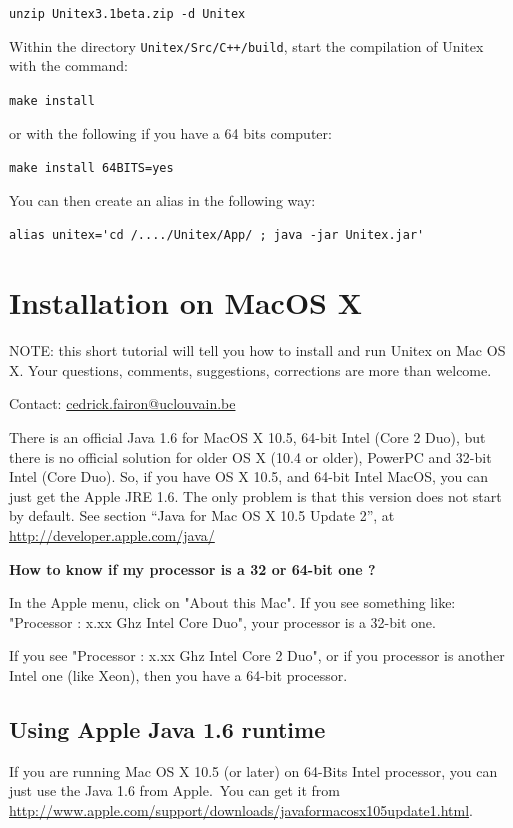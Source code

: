 \bigskip \noindent \verb$unzip Unitex3.1beta.zip -d Unitex$

\bigskip
\noindent Within the directory \verb|Unitex/Src/C++/build|, start the compilation
of Unitex with the command:

\bigskip \verb+make install+

\bigskip
\noindent or with the following if you have a 64 bits computer:
 
\bigskip \verb+make install 64BITS=yes+

\bigskip
\noindent You can then create an alias in the following way:

\bigskip \verb$alias unitex='cd /..../Unitex/App/ ; java -jar Unitex.jar'$


\section{Installation on MacOS X}
\label{section-macos-install}
\noindent NOTE: this short tutorial will tell you how to install and run 
Unitex on Mac OS X. Your questions, comments, suggestions, 
corrections are more than welcome. 

\noindent Contact: \url{cedrick.fairon@uclouvain.be}

\bigskip
\noindent There is an official Java 1.6 for MacOS X 10.5, 64-bit Intel 
(Core 2 Duo), but there is no official solution for older OS X (10.4 or older),
PowerPC and 32-bit Intel (Core Duo). So,
 if you have OS X 10.5, and 64-bit Intel MacOS, you can just get the
    Apple JRE 1.6. The only problem is that this version does not start by
    default. See section ``Java for Mac OS X 10.5 Update 2'', 
    at \url{http://developer.apple.com/java/}

\noindent\textbf{How to know if my processor is a 32 or 64-bit one ?}

\noindent In the Apple menu, click on "About this Mac". If you see something
like: "Processor : x.xx Ghz Intel Core Duo", your processor is a 32-bit one.

\bigskip
\noindent If you see "Processor : x.xx Ghz Intel Core 2 Duo", or if you
processor is another Intel one (like Xeon), then you have a 64-bit processor.

\subsection{Using Apple Java 1.6 runtime}
\bigskip{}
\noindent If you are running Mac OS X 10.5 (or later) on 64-Bits Intel processor, you can just use the Java 1.6 from Apple.\ You can get it from \url{http://www.apple.com/support/downloads/javaformacosx105update1.html}.

